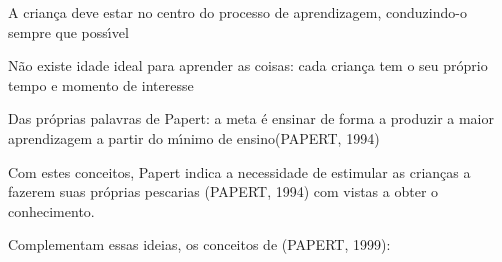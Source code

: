 \documentclass[
12pt,		%
openright,	%
twoside,  %
a4paper,			%
chapter=TITLE,		%
english,			%
french,				%
spanish,			%
brazil				%
]{USPSC-classe/USPSC}
\begin{document}
\begin{alineas}
\item A crian\c{c}a deve estar no centro do processo de aprendizagem, conduzindo-o sempre que poss\'{\i}vel
\item N\~ao existe idade ideal para aprender as coisas: cada crian\c{c}a tem o seu pr\'oprio tempo e momento de interesse
\item Das pr\'oprias palavras de Papert: \textquotedbl a meta \'e ensinar de forma a produzir a maior aprendizagem a partir do m\'{\i}nimo de ensino\textquotedbl   (PAPERT, 1994)
\end{alineas}

Com estes conceitos, Papert indica a necessidade de estimular as crian\c{c}as a fazerem suas pr\'oprias pescarias  (PAPERT, 1994) com vistas a obter o conhecimento.

















Complementam essas ideias, os conceitos de  (PAPERT, 1999):
\end{document}

